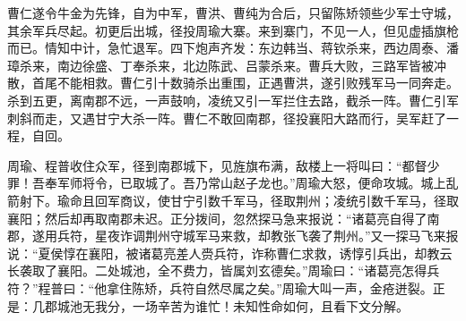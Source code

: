 曹仁遂令牛金为先锋，自为中军，曹洪、曹纯为合后，只留陈矫领些少军士守城，其余军兵尽起。初更后出城，径投周瑜大寨。来到寨门，不见一人，但见虚插旗枪而已。情知中计，急忙退军。四下炮声齐发：东边韩当、蒋钦杀来，西边周泰、潘璋杀来，南边徐盛、丁奉杀来，北边陈武、吕蒙杀来。曹兵大败，三路军皆被冲散，首尾不能相救。曹仁引十数骑杀出重围，正遇曹洪，遂引败残军马一同奔走。杀到五更，离南郡不远，一声鼓响，凌统又引一军拦住去路，截杀一阵。曹仁引军刺斜而走，又遇甘宁大杀一阵。曹仁不敢回南郡，径投襄阳大路而行，吴军赶了一程，自回。

周瑜、程普收住众军，径到南郡城下，见旌旗布满，敌楼上一将叫曰：“都督少罪！吾奉军师将令，已取城了。吾乃常山赵子龙也。”周瑜大怒，便命攻城。城上乱箭射下。瑜命且回军商议，使甘宁引数千军马，径取荆州；凌统引数千军马，径取襄阳；然后却再取南郡未迟。正分拨间，忽然探马急来报说：“诸葛亮自得了南郡，遂用兵符，星夜诈调荆州守城军马来救，却教张飞袭了荆州。”又一探马飞来报说：“夏侯惇在襄阳，被诸葛亮差人赍兵符，诈称曹仁求救，诱惇引兵出，却教云长袭取了襄阳。二处城池，全不费力，皆属刘玄德矣。”周瑜曰：“诸葛亮怎得兵符？”程普曰：“他拿住陈矫，兵符自然尽属之矣。”周瑜大叫一声，金疮迸裂。正是：几郡城池无我分，一场辛苦为谁忙！未知性命如何，且看下文分解。